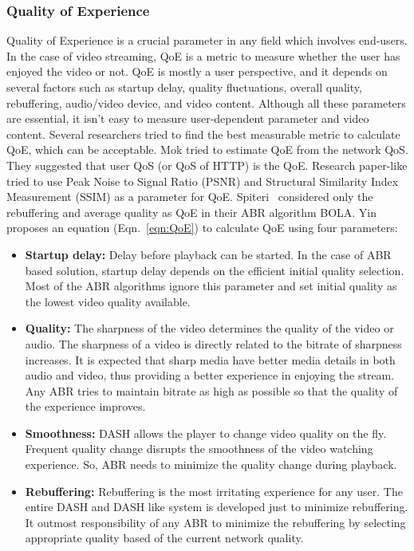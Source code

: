 \subsubsection{Quality of Experience}
Quality of Experience is a crucial parameter in any field which involves end-users. In the case of video streaming, QoE is a metric to measure whether the user has enjoyed the video or not. QoE is mostly a user perspective, and it depends on several factors such as startup delay, quality fluctuations, overall quality, rebuffering, audio/video device, and video content. Although all these parameters are essential, it isn't easy to measure user-dependent parameter and video content. Several researchers tried to find the best measurable metric to calculate QoE, which can be acceptable. Mok \etal \cite{5990550} tried to estimate QoE from the network QoS. They suggested that user QoS (or QoS of HTTP) is the QoE. Research paper-like \cite{} tried to use Peak Noise to Signal Ratio (PSNR) and Structural Similarity Index Measurement (SSIM) as a parameter for QoE. Spiteri \etal\ considered only the rebuffering and average quality as QoE in their ABR algorithm BOLA\cite{Spiteri2016}. Yin \etal\cite{yin2015control} proposes an equation (Eqn.~\ref{eqn:QoE}) to calculate QoE using four parameters:
\begin{itemize}
	\item {\bf Startup delay:} Delay before playback can be started. In the case of ABR based solution, startup delay depends on the efficient initial quality selection. Most of the ABR algorithms ignore this parameter and set initial quality as the lowest video quality available.
	\item {\bf Quality:} The sharpness of the video determines the quality of the video or audio. The sharpness of a video is directly related to the bitrate of sharpness increases. It is expected that sharp media have better media details in both audio and video, thus providing a better experience in enjoying the stream. Any ABR tries to maintain bitrate as high as possible so that the quality of the experience improves.
	\item {\bf Smoothness:} DASH allows the player to change video quality on the fly. Frequent quality change disrupts the smoothness of the video watching experience. So, ABR needs to minimize the quality change during playback.
	\item {\bf Rebuffering:} Rebuffering is the most irritating experience for any user. The entire DASH and DASH like system is developed just to minimize rebuffering. It outmost responsibility of any ABR to minimize the rebuffering by selecting appropriate quality based of the current network quality.
\end{itemize}
